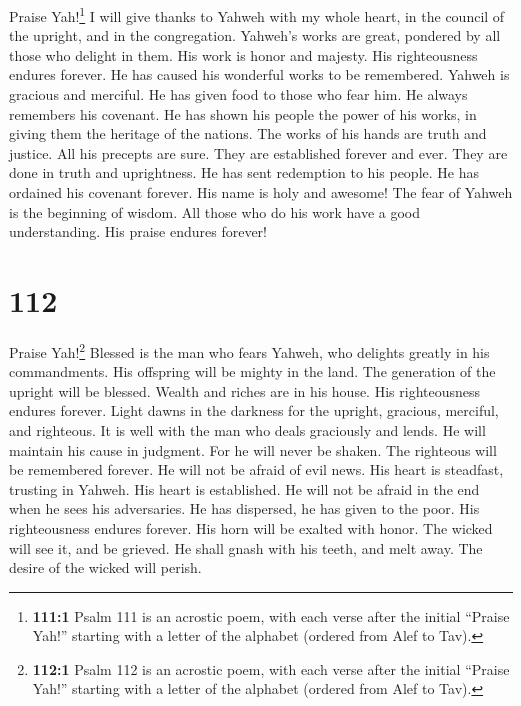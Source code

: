  Praise Yah!\footnote{\textbf{111:1} Psalm 111 is an
  acrostic poem, with each verse after the initial ``Praise Yah!''
  starting with a letter of the alphabet (ordered from Alef to Tav).} I
will give thanks to Yahweh with my whole heart, in the council of the
upright, and in the congregation.  Yahweh's works are
great, pondered by all those who delight in them.  His
work is honor and majesty. His righteousness endures forever.
 He has caused his wonderful works to be remembered.
Yahweh is gracious and merciful.  He has given food to
those who fear him. He always remembers his covenant.  He
has shown his people the power of his works, in giving them the heritage
of the nations.  The works of his hands are truth and
justice. All his precepts are sure.  They are established
forever and ever. They are done in truth and uprightness. 
He has sent redemption to his people. He has ordained his covenant
forever. His name is holy and awesome!  The fear of
Yahweh is the beginning of wisdom. All those who do his work have a good
understanding. His praise endures forever!

\hypertarget{section-104}{%
\section{112}\label{section-104}}

 Praise Yah!\footnote{\textbf{112:1} Psalm 112 is an
  acrostic poem, with each verse after the initial ``Praise Yah!''
  starting with a letter of the alphabet (ordered from Alef to Tav).}
Blessed is the man who fears Yahweh, who delights greatly in his
commandments.  His offspring will be mighty in the land.
The generation of the upright will be blessed.  Wealth and
riches are in his house. His righteousness endures forever.
 Light dawns in the darkness for the upright, gracious,
merciful, and righteous.  It is well with the man who
deals graciously and lends. He will maintain his cause in judgment.
 For he will never be shaken. The righteous will be
remembered forever.  He will not be afraid of evil news.
His heart is steadfast, trusting in Yahweh.  His heart is
established. He will not be afraid in the end when he sees his
adversaries.  He has dispersed, he has given to the poor.
His righteousness endures forever. His horn will be exalted with honor.
 The wicked will see it, and be grieved. He shall gnash
with his teeth, and melt away. The desire of the wicked will perish.


